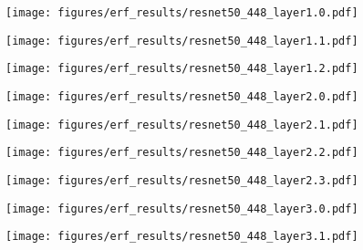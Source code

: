 \documentclass{article}
\begin{document}
\begin{figure}[tb]
  \raggedright
  \begin{minipage}[t]{0.13\hsize}
    \centering
    \texttt{[image: figures/erf\_results/resnet50\_448\_layer1.0.pdf]}
    \label{figure:erf_resnet_448:0}
  \end{minipage}
  \begin{minipage}[t]{0.13\hsize}
    \centering
    \texttt{[image: figures/erf\_results/resnet50\_448\_layer1.1.pdf]}
    \label{figure:erf_resnet_448:1}
  \end{minipage}
  \begin{minipage}[t]{0.13\hsize}
    \centering
    \texttt{[image: figures/erf\_results/resnet50\_448\_layer1.2.pdf]}
    \label{figure:erf_resnet_448:2}
  \end{minipage}
  \begin{minipage}[t]{0.13\hsize}
    \centering
    \texttt{[image: figures/erf\_results/resnet50\_448\_layer2.0.pdf]}
    \label{figure:erf_resnet_448:3}
  \end{minipage}
  \begin{minipage}[t]{0.13\hsize}
    \centering
    \texttt{[image: figures/erf\_results/resnet50\_448\_layer2.1.pdf]}
    \label{figure:erf_resnet_448:4}
  \end{minipage}
  \begin{minipage}[t]{0.13\hsize}
    \centering
    \texttt{[image: figures/erf\_results/resnet50\_448\_layer2.2.pdf]}
    \label{figure:erf_resnet_448:5}
  \end{minipage}
  \begin{minipage}[t]{0.13\hsize}
    \centering
    \texttt{[image: figures/erf\_results/resnet50\_448\_layer2.3.pdf]}
    \label{figure:erf_resnet_448:6}
  \end{minipage}
  \begin{minipage}[t]{0.13\hsize}
    \centering
    \texttt{[image: figures/erf\_results/resnet50\_448\_layer3.0.pdf]}
    \label{figure:erf_resnet_448:7}
  \end{minipage}
  \begin{minipage}[t]{0.13\hsize}
    \centering
    \texttt{[image: figures/erf\_results/resnet50\_448\_layer3.1.pdf]}

\end{minipage}
\end{figure}
\end{document}
